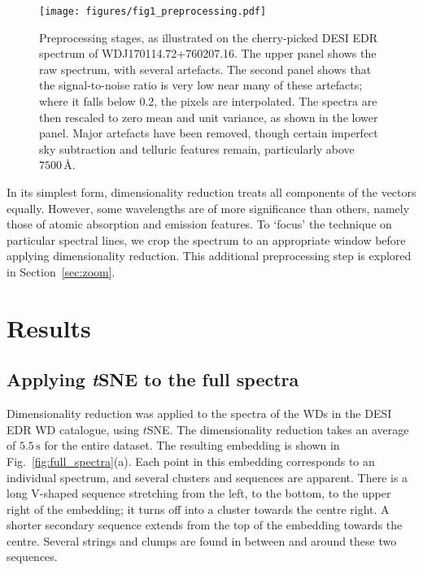 \documentclass[fleqn,usenatbib]{mnras}
\begin{document}
\begin{figure*}
\centering
\texttt{[image: figures/fig1\_preprocessing.pdf]}
\caption{
    Preprocessing stages, as illustrated on the cherry-picked DESI EDR spectrum of WDJ170114.72+760207.16.
    The upper panel shows the raw spectrum, with several artefacts.
    The second panel shows that the signal-to-noise ratio is very low near many of these artefacts; where it falls below 0.2, the pixels are interpolated.
    The spectra are then rescaled to zero mean and unit variance, as shown in the lower panel.
    Major artefacts have been removed, though certain imperfect sky subtraction and telluric features remain, particularly above $7500\,\text{\AA}$.
}
\label{fig:preprocessing}
\end{figure*}

In its simplest form, dimensionality reduction treats all components of the vectors equally.
However, some wavelengths are of more significance than others, namely those of atomic absorption and emission features.
To `focus' the technique on particular spectral lines, we crop the spectrum to an appropriate window before applying dimensionality reduction.
This additional preprocessing step is explored in Section~\ref{sec:zoom}.

\section{Results}
\label{sec:results}

\subsection{Applying \textit{t}SNE to the full spectra}
\label{sec:full_spectra}

Dimensionality reduction was applied to the spectra of the WDs in the DESI EDR WD catalogue, using $t$SNE.
The dimensionality reduction takes an average of $5.5\,\text{s}$ for the entire dataset.
The resulting embedding is shown in Fig.~\ref{fig:full_spectra}(a).
Each point in this embedding corresponds to an individual spectrum, and several clusters and sequences are apparent.
There is a long V-shaped sequence stretching from the left, to the bottom, to the upper right of the embedding; it turns off into a cluster towards the centre right.
A shorter secondary sequence extends from the top of the embedding towards the centre.
Several strings and clumps are found in between and around these two sequences.
\end{document}
